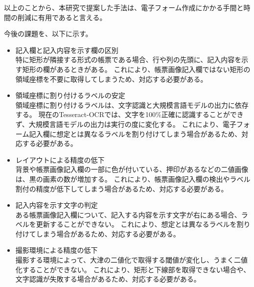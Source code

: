以上のことから、本研究で提案した手法は、電子フォーム作成にかかる手間と時間の削減に有用であると言える。

今後の課題を、以下に示す。

\begin{itemize}
    \item 記入欄と記入内容を示す欄の区別\\
        特に矩形が隣接する形式の帳票である場合、行や列の先頭に、記入内容を示す矩形の欄があるときがある。
        これにより、帳票画像記入欄ではない矩形の領域座標を不要に取得してしまうため、対応する必要がある。
    \item 領域座標に割り付けるラベルの安定\\
        領域座標に割り付けるラベルは、文字認識と大規模言語モデルの出力に依存する。
        現在のTesseract-OCRでは、文字を100\%正確に認識することができず、大規模言語モデルの出力は実行の度に変化する。
        これにより、電子フォーム記入欄に想定とは異なるラベルを割り付けてしまう場合があるため、対応する必要がある。
    \item レイアウトによる精度の低下\\
        背景や帳票画像記入欄の一部に色が付いている、押印があるなどの二値画像は、黒の画素の数が増加する。
        これにより、帳票画像記入欄の検出やラベル割付の精度が低下してしまう場合があるため、対応する必要がある。
    \item 記入内容を示す文字の判定\\
        ある帳票画像記入欄について、記入する内容を示す文字が右にある場合、ラベルを更新することができない。
        これにより、想定とは異なるラベルを割り付けてしまう場合があるため、対応する必要がある。
    \item 撮影環境による精度の低下\\
        撮影する環境によって、大津の二値化で取得する閾値が変化し、うまく二値化することができない。
        これにより、矩形と下線部を取得できない場合や、文字認識が失敗する場合があるため、対応する必要がある。
\end{itemize}